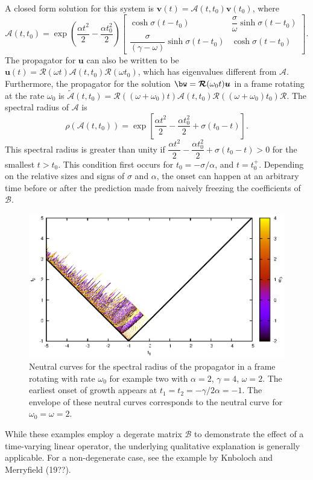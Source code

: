 \documentclass[letterpaper,10pt]{article}
\newcommand{\bu}{\boldsymbol{u}}
\newcommand{\bv}{\boldsymbol{v}}
\newcommand{\cA}{\boldsymbol{\mathcal{A}}}
\newcommand{\cB}{\boldsymbol{\mathcal{B}}}
\newcommand{\cR}{\boldsymbol{\mathcal{R}}}
\begin{document}
A closed form solution for this system is $\bv(t) = \cA(t,t_0) \bv(t_0)$, where
\begin{equation}
 \cA(t,t_0) = \exp \left(\dfrac{\alpha t^2}{2} - \dfrac{\alpha t_0^2}{2} \right)
 \begin{bmatrix}
                                 \cosh \sigma (t-t_0) & \dfrac{\sigma}{\omega} \sinh \sigma(t-t_0) \\
 \dfrac{\sigma}{(\gamma-\omega)} \sinh \sigma (t-t_0) &                         \cosh\sigma (t-t_0)
 \end{bmatrix}
.
\end{equation}
The propagator for $\bu$ can also be written to be $\bu(t) = \cR(\omega t) \cA(t, t_0) \cR(\omega t_0)$, which has eigenvalues different from $\cA$. 
Furthermore, the propagator for the solution $\bw = \cR(\omega_0 t) \bu$ in a frame rotating at the rate $\omega_0$ is $\tilde{\cA}(t,t_0) = \cR((\omega+\omega_0)t) \cA(t, t_0) \cR((\omega+\omega_0)t_0)\cR$.
The spectral radius of $\cA$ is
\begin{equation}
 \rho(\cA (t, t_0)) = \exp \left[ \dfrac{\alpha t^2}{2} - \dfrac{\alpha t_0^2}{2} + \sigma (t_0-t) \right]. 
\end{equation}
This spectral radius is greater than unity if $\dfrac{\alpha t^2}{2} - \dfrac{\alpha t_0^2}{2} + \sigma (t_0-t)>0$ for the smallest $t>t_0$. 
This condition first occurs for $t_0 = -\sigma/\alpha$, and $t=t_0^{+}$. 
Depending on the relative sizes and signs of $\sigma$ and $\alpha$, the onset can happen at an arbitrary time before or after the prediction made from naively freezing the coefficients of $\cB$.

\begin{figure}
\includegraphics{Figures/beta1/beta}
\caption{Neutral curves for the spectral radius of the propagator in a frame rotating with rate $\omega_0$ for example two with $\alpha=2$, $\gamma=4$, $\omega=2$. The earliest onset of growth appears at $t_1=t_2=-\gamma/2\alpha=-1$. The envelope of these neutral curves corresponds to the neutral curve for $\omega_0 = \omega = 2$. }
\end{figure}


While these examples employ a degerate matrix $\cB$ to demonstrate the effect of a time-varying linear operator, the underlying qualitative explanation is generally applicable. For a non-degenerate case, see the example by Knboloch and Merryfield (19??).
\end{document}
